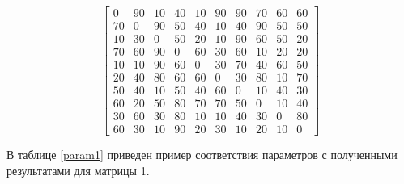 \documentclass[a4paper,12pt]{article}
\begin{document}
\begin{enumerate}
	\[
	\begin{bmatrix}
	0& 90& 10& 40& 10& 90& 90& 70& 60& 60\\
	70& 0& 90& 50& 40& 10& 40& 90& 50& 50\\
	10& 30& 0& 50& 20& 10& 90& 60& 50& 20\\
	70& 60& 90& 0& 60& 30& 60& 10& 20& 20\\
	10& 10& 90& 60& 0& 30& 70& 40& 60& 50\\
	20& 40& 80& 60& 60& 0& 30& 80& 10& 70\\
	50& 40& 10& 50& 40& 60& 0& 10& 40& 30\\
	60& 20& 50& 80& 70& 70& 50& 0& 10& 40\\
	30& 60& 30& 80& 10& 10& 40& 30& 0& 80\\
	60& 30& 10& 90& 20& 30& 10& 20& 10& 0
	\end{bmatrix}
	\]
	
\end{enumerate}

В таблице \ref{param1} приведен пример соответствия параметров
с полученными результатами для матрицы 1.
\end{document}
